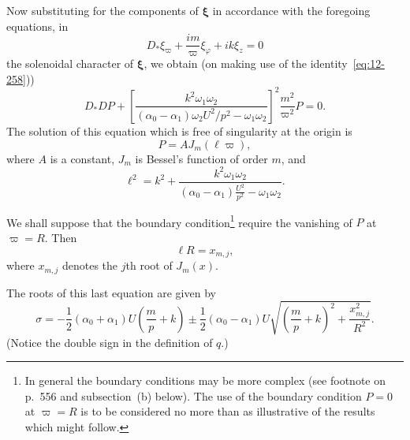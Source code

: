Now substituting for the components of $\boldsymbol\xi$ in accordance with the foregoing equations, in
\begin{equation}
\label{eq:12-286}
D_*\xi_\varpi + \frac{im}{\varpi}\xi_\varphi + ik\xi_z = 0
\end{equation}
the solenoidal character of $\boldsymbol\xi$, we obtain (on making use of the identity~\eqref{eq:12-258}))
\begin{equation}
\label{eq:12-287}
D_*DP + \left[\frac{k^2\omega_1\omega_2}{(\alpha_0-\alpha_1)\omega_2 U^2/p^2 - \omega_1\omega_2}\right]^2\frac{m^2}{\varpi^2}P = 0.
\end{equation}
The solution of this equation which is free of singularity at the origin is
\begin{equation}
\label{eq:12-288}
P = AJ_m(\ell\varpi),
\end{equation}
where $A$ is a constant, $J_m$ is Bessel's function of order $m$, and
\begin{equation}
\label{eq:12-289}
\ell^2 = k^2 + \frac{k^2\omega_1\omega_2}{(\alpha_0-\alpha_1)\frac{U^2}{p^2} - \omega_1\omega_2}.
\end{equation}

We shall suppose that the boundary condition\footnote{In general the boundary conditions may be more complex (see footnote on p.~556 and subsection~(b) below). The use of the boundary condition $P = 0$ at $\varpi = R$ is to be considered no more than as illustrative of the results which might follow.} require the vanishing of $P$ at $\varpi = R$. Then
\begin{equation}
\label{eq:12-290}
\ell R = x_{m,j},
\end{equation}
where $x_{m,j}$ denotes the $j$th root of $J_m(x)$.

The roots of this last equation are given by
\begin{equation}
\label{eq:12-291}
\sigma = -\frac{1}{2}(\alpha_0+\alpha_1)U\left(\frac{m}{p}+k\right) \pm \frac{1}{2}(\alpha_0-\alpha_1)U\sqrt{\left(\frac{m}{p}+k\right)^2 + \frac{x_{m,j}^2}{R^2}}.
\end{equation}
(Notice the double sign in the definition of $q$.)

